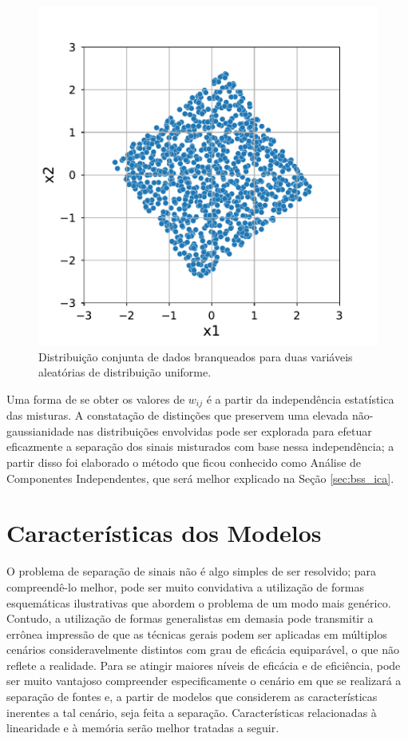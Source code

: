 \begin{figure}[H]
    \centering
    \includegraphics[width=0.70\linewidth]{figs/whitening/data_white.pdf}
    \caption{Distribuição conjunta de dados branqueados para duas variáveis aleatórias de distribuição uniforme.}
    \label{fig:bss_pca_whitening_data_white}
\end{figure}




Uma forma de se obter os valores de $w_{ij}$ é a partir da independência estatística das misturas. A constatação de distinções que preservem uma elevada não-gaussianidade nas distribuições envolvidas pode ser explorada para efetuar eficazmente a separação dos sinais misturados com base nessa independência; a partir disso foi elaborado o método que ficou conhecido como Análise de Componentes Independentes, que será melhor explicado na Seção \ref{sec:bss_ica}.



\section{Características dos Modelos}
\label{sec:bss_characteristics}

O problema de separação de sinais não é algo simples de ser resolvido; para compreendê-lo melhor, pode ser muito convidativa a utilização de formas esquemáticas ilustrativas que abordem o problema de um modo mais genérico. Contudo, a utilização de formas generalistas em demasia pode transmitir a errônea impressão de que as técnicas gerais podem ser aplicadas em múltiplos cenários consideravelmente distintos com grau de eficácia equiparável, o que não reflete a realidade. Para se atingir maiores níveis de eficácia e de eficiência, pode ser muito vantajoso compreender especificamente o cenário em que se realizará a separação de fontes e, a partir de modelos que considerem as características inerentes a tal cenário, seja feita a separação. Características relacionadas à linearidade e à memória serão melhor tratadas a seguir.


